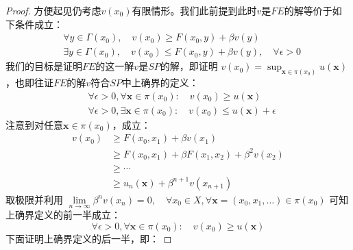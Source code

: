 \begin{proof}
    方便起见仍考虑$v\left(x_0\right)$有限情形。我们此前提到此时$v$是$FE$的解等价于如下条件成立：
    $$
    \begin{aligned}
        &\forall y \in \Gamma\left(x_0\right),\quad v\left(x_0\right)\geq F\left(x_0,y\right) + \beta v\left(y\right)\\
        &\exists y\in \Gamma\left(x_0\right),\quad v\left(x_0\right)\leq F\left(x_0,y\right) + \beta v\left(y\right), \quad \forall \epsilon > 0
    \end{aligned}
    $$
    我们的目标是证明$FE$的这一解$v$是$SP$的解，即证明
    $v\left(x_0\right)=\sup _{\boldsymbol{x}\in\pi\left(x_0\right)} u\left(\boldsymbol{x}\right)$，也即往证$FE$的解$v$符合$SP$中上确界的定义：
    \begin{equation*}
        \begin{aligned}
            &\forall \epsilon > 0, \forall \boldsymbol{x}\in \pi\left(x_0\right): \quad v\left(x_0\right)\geq u\left(\boldsymbol{x}\right) \\
            &\forall \epsilon > 0, \exists \boldsymbol{x}\in\pi\left(x_0\right): \quad v\left(x_0\right)\leq u\left(\boldsymbol{x}\right)+\epsilon
        \end{aligned}
    \end{equation*}
    注意到对任意$\boldsymbol{x}\in \pi\left(x_0\right)$，成立：
    \begin{equation*}
        \begin{aligned}
            v\left(x_0\right) &\geq F\left(x_0,x_1\right) + \beta v\left(x_1\right) \\
                &\geq  F\left(x_0,x_1\right) + \beta F\left(x_1,x_2\right) + \beta^2v\left(x_2\right) \\
                &\geq \cdots \\
                &\geq u_n\left(\boldsymbol{x}\right)+\beta^{n+1}v\left(x_{n+1}\right)
        \end{aligned}
    \end{equation*}
    取极限并利用
    $\lim\limits_{n\rightarrow \infty}\beta^n v\left(x_n\right)=0, 
        \quad \forall x_0\in X, \forall \boldsymbol{x}=\left(x_0,x_1,\dots\right)\in \pi\left(x_0\right)$
    可知上确界定义的前一半成立：
    \begin{equation*}
        \forall \epsilon > 0, \forall \boldsymbol{x}\in \pi\left(x_0\right): 
            \quad v\left(x_0\right)\geq u\left(\boldsymbol{x}\right)
    \end{equation*}
    下面证明上确界定义的后一半，即：

\end{proof}
